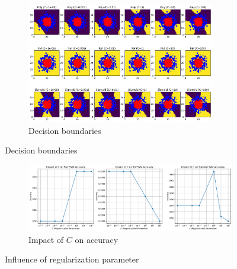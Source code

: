 \begin{figure}[H]
    \centering
    \begin{subfigure}{\textwidth}
        \centering
        \includegraphics[width=0.9\textwidth]{figs/NN/svm_regularization_grid.pdf}
        \caption{Decision boundaries}
        \label{subfig:svm_regularization_grid}
    \end{subfigure}
\end{figure}

\begin{figure}[H]\ContinuedFloat
    \centering
    \begin{subfigure}{0.9\textwidth}
        \centering
        \includegraphics[width=\textwidth]{figs/NN/svm_regularization_acc.pdf}
        \caption{Impact of $C$ on accuracy}
        \label{subfig:svm_regularization_acc}
    \end{subfigure}
    \caption{Influence of regularization parameter}
    \label{fig:svm_regularization}
\end{figure}
